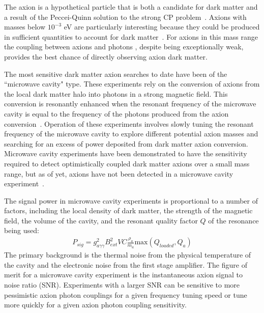 \documentclass[aps,prl,twocolumn,groupedaddress]{revtex4-1}
\begin{document}
The axion is a hypothetical particle that is both a candidate for dark matter and a result of the Peccei-Quinn solution to the strong CP problem~\cite{Peccei,Peccei_2,PhysRevLett.40.223,PhysRevLett.40.279,Preskill1983127,Abbott1983,ipser-sikivie}.
Axions with masses below $10^{-3}$ eV are particularly interesting because they could be produced in sufficient quantities to account for 
dark matter~\cite{Turner199067}.
For axions in this mass range the coupling between axions and photons
, despite being exceptionally weak, provides the best chance of directly observing axion dark matter.

The most sensitive dark matter axion searches to date have been of the ``microwave cavity" type.
These experiments rely on the conversion of axions from the local dark matter halo into photons in a strong magnetic field.
This conversion is resonantly enhanced when the resonant frequency of the microwave cavity is equal to the frequency of the photons produced from the axion conversion~\cite{PhysRevLett.51.1415}.
Operation of these experiments involves slowly tuning the resonant frequency of the microwave cavity to explore different potential axion masses and searching for an excess of power deposited from dark matter axion conversion.
Microwave cavity experiments have been demonstrated to have the sensitivity required to detect optimistically coupled dark matter axions over a small mass range,
but as of yet, axions have not been detected in a microwave cavity experiment~\cite{PhysRevLett.104.041301}.

The signal power in microwave cavity experiments is proportional to a number of factors, including the local density of dark matter, the strength of the magnetic field, the volume of the cavity, and the resonant 
quality factor $Q$ of the resonance being used:
\begin{align}
P_{sig} = g_{a\gamma\gamma}^2B_{ext}^2VC\frac{\rho_a}{m_a}\text{max}(Q_{loaded},Q_a)
\end{align}
The primary background is the thermal noise from the physical temperature of the cavity and the electronic noise from the first stage amplifier.  
The figure of merit for a microwave cavity experiment is the instantaneous axion signal to noise ratio (SNR).
Experiments with a larger SNR can be sensitive to more pessimistic axion photon couplings for a given frequency tuning speed or tune more quickly for a given axion photon coupling sensitivity.
\end{document}

